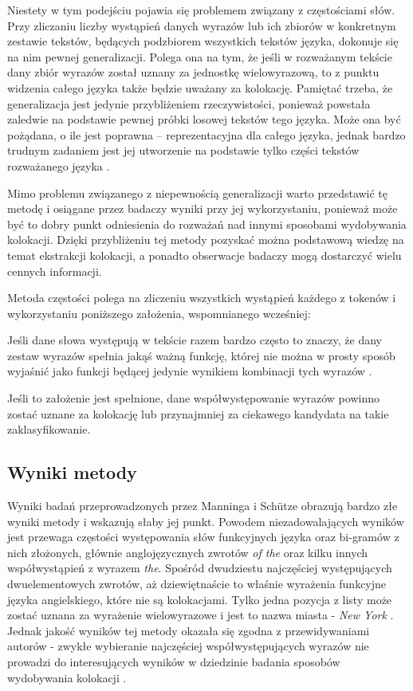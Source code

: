 \par
Niestety w tym podejściu pojawia się problemem związany z częstościami słów.
Przy zliczaniu liczby wystąpień danych wyrazów lub ich zbiorów w konkretnym zestawie tekstów, będących podzbiorem wszystkich tekstów języka, dokonuje się na nim pewnej generalizacji.
Polega ona na tym, że jeśli w rozważanym tekście dany zbiór wyrazów został uznany za jednostkę wielowyrazową, to z punktu widzenia całego języka także będzie uważany za kolokację.
Pamiętać trzeba, że generalizacja jest jedynie przybliżeniem rzeczywistości, ponieważ powstała zaledwie na podstawie pewnej próbki losowej tekstów tego języka.
Może ona być pożądana, o ile jest poprawna -- reprezentacyjna dla całego języka, jednak bardzo trudnym zadaniem jest jej utworzenie na podstawie tylko części tekstów rozważanego języka \cite[str. 20]{evert}.

\par
Mimo problemu związanego z niepewnością generalizacji warto przedstawić tę metodę i osiągane przez badaczy wyniki przy jej wykorzystaniu, ponieważ może być to dobry punkt odniesienia do rozważań nad innymi sposobami wydobywania kolokacji.
Dzięki przybliżeniu tej metody pozyskać można podstawową wiedzę na temat ekstrakcji kolokacji, a ponadto obserwacje badaczy mogą dostarczyć wielu cennych informacji.

\par
Metoda częstości polega na zliczeniu wszystkich wystąpień każdego z tokenów i wykorzystaniu poniższego założenia, wspomnianego wcześniej:

\begin{center}
Jeśli dane słowa występują w tekście razem bardzo często to znaczy, że dany zestaw wyrazów spełnia jakąś ważną funkcję, której nie można w prosty sposób wyjaśnić jako funkcji będącej jedynie wynikiem kombinacji tych wyrazów \cite[str. 153]{mit}.
\end{center}

Jeśli to założenie jest spełnione, dane współwystępowanie wyrazów powinno zostać uznane za kolokację lub przynajmniej za ciekawego kandydata na takie zaklasyfikowanie.


\subsection{Wyniki metody}
Wyniki badań przeprowadzonych przez Manninga i Schütze \cite[str. 154]{mit} obrazują bardzo złe wyniki metody i wskazują słaby jej punkt.
Powodem niezadowalających wyników jest przewaga częstości występowania słów funkcyjnych języka oraz bi-gramów z nich złożonych, głównie anglojęzycznych zwrotów \emph{of the} oraz kilku innych współwystąpień z wyrazem \emph{the}.
Spośród dwudziestu najczęściej występujących dwuelementowych zwrotów, aż dziewiętnaście to właśnie wyrażenia funkcyjne języka angielskiego, które nie są kolokacjami.
Tylko jedna pozycja z listy może zostać uznana za wyrażenie wielowyrazowe i jest to nazwa miasta - \emph{New York} \cite[154]{mit}.
Jednak jakość wyników tej metody okazała się zgodna z przewidywaniami autorów \cite{mit} - zwykłe wybieranie najczęściej współwystępujących wyrazów nie prowadzi do interesujących wyników w dziedzinie badania sposobów wydobywania kolokacji \cite[str. 153]{mit}.


